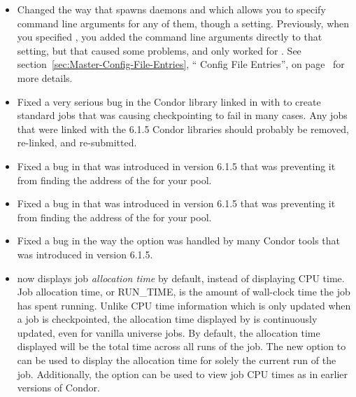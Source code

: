 \begin{itemize}
\item Changed the way that  spawns daemons and
 which allows you to specify command line arguments for
any of them, though a  setting.
Previously, when you specified , you added the command
line arguments directly to that setting, but that caused some
problems, and only worked for .
See section~\ref{sec:Master-Config-File-Entries}, ``
Config File Entries'', on
page~\pageref{sec:Master-Config-File-Entries} for more details.

\item Fixed a very serious bug in the Condor library linked in with
 to create standard jobs that was causing
checkpointing to fail in many cases.  
Any jobs that were linked with the 6.1.5 Condor libraries should
probably be removed, re-linked, and re-submitted. 

\item Fixed a bug in  that was introduced in version
6.1.5 that was preventing it from finding the address of the
 for your pool.

\item Fixed a bug in  that was introduced in version
6.1.5 that was preventing it from finding the address of the
 for your pool.

\item Fixed a bug in the way the  option was handled by
many Condor tools that was introduced in version 6.1.5. 


\item {} now displays job \emph{allocation time} by default, instead
of displaying CPU time.  
Job allocation time, or RUN\_TIME, is the amount of wall-clock time the job
has spent running.  
Unlike CPU time information which is only updated when a job is
checkpointed, the allocation time displayed by  is continuously
updated, even for vanilla universe jobs.  
By default, the allocation time displayed will be the total time across all
runs of the job.  
The new  option to  can be used to display the
allocation time for solely the current run of the job.
Additionally, the  option can be used to view job CPU times as
in earlier versions of Condor.


\end{itemize}

